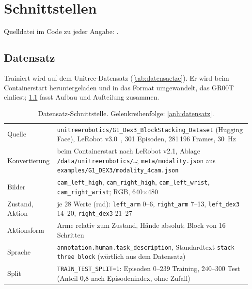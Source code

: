 
\chapter{Schnittstellen}
\label{chap:schnittstellen}
\label{chap:umsetzung}
\label{chap:methoden}

Quelldatei im Code zu jeder Angabe: .

\section{Datensatz}
\label{sec:if-datensatz}
\label{sec:datensatz}
\label{sec:training}

Trainiert wird auf dem Unitree-Datensatz (\cref{tab:datensaetze}). Er wird beim Containerstart
heruntergeladen und in das Format umgewandelt, das GR00T einliest; \cref{tab:if-datensatz}
fasst Aufbau und Aufteilung zusammen.

\begin{table}[htb]
  \centering
  \begin{tabularx}{\linewidth}{lX}
    \toprule
    Quelle & \texttt{unitreerobotics/G1\_Dex3\_BlockStacking\_Dataset} (Hugging Face), LeRobot
             v3.0~\cite{lerobot2024}, 301 Episoden, 281\,196 Frames, 30~Hz \\
    Konvertierung & beim Containerstart nach LeRobot v2.1, Ablage
             \texttt{/data/unitreerobotics/\dots}; \texttt{meta/modality.json} aus
             \texttt{examples/G1\_DEX3/modality\_4cam.json} \\
    Bilder & \texttt{cam\_left\_high}, \texttt{cam\_right\_high}, \texttt{cam\_left\_wrist},
             \texttt{cam\_right\_wrist}; RGB, 640$\times$480 \\
    Zustand, Aktion & je 28 Werte (rad): \texttt{left\_arm} 0--6, \texttt{right\_arm} 7--13,
             \texttt{left\_dex3} 14--20, \texttt{right\_dex3} 21--27 \\
    Aktionsform & Arme relativ zum Zustand, Hände absolut; Block von 16 Schritten \\
    Sprache & \texttt{annotation.human.task\_description}, Standardtext
             \texttt{stack three block} (wörtlich aus dem Datensatz) \\
    Split & \texttt{TRAIN\_TEST\_SPLIT=1}: Episoden 0--239 Training, 240--300 Test
             (Anteil 0,8 nach Episodenindex, ohne Zufall) \\
    \bottomrule
  \end{tabularx}
  \caption{Datensatz-Schnittstelle. Gelenkreihenfolge: \cref{anh:datensatz}.}
  \label{tab:if-datensatz}
\end{table}

